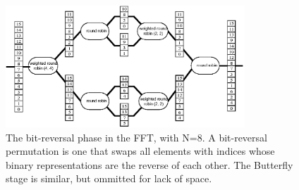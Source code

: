 \begin{figure}[t]
\begin{center}
%
\includegraphics[width=3.53in]{fft-pre-tape.eps}
\vspace{-6pt}
\caption{The bit-reversal phase in the FFT, with N=8.  A bit-reversal permutation is one that swaps all elements with indices whose binary representations are the reverse of each other.  The Butterfly stage is similar, but ommitted for lack of space.
\protect\label{fig:bitreverseorder}}
\vspace{-18pt}
\end{center}
\end{figure}



